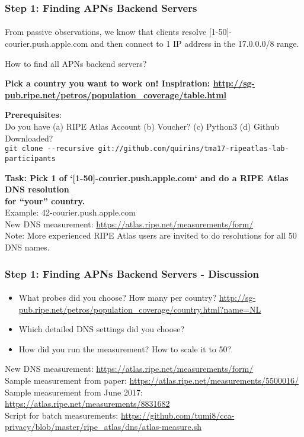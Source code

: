 \begin{frame}
\frametitle{Step 1: Finding APNs Backend Servers}
\framesubtitle{}

From passive observations, we know that clients resolve [1-50]-courier.push.apple.com and then connect to 1 IP address in the 17.0.0.0/8 range.

How to find all APNs backend servers?
\pause

\textbf{Pick a country you want to work on! Inspiration: \url{http://sg-pub.ripe.net/petros/population_coverage/table.html}}
\pause

\textbf{Prerequisites}: \\ 
Do you have (a) RIPE Atlas Account (b) Voucher? (c) Python3 (d) Github Downloaded? \\
\texttt{git clone -{}-recursive git://github.com/quirins/tma17-ripeatlas-lab-participants}

\pause

\textbf{Task: Pick 1 of `[1-50]-courier.push.apple.com` and do a RIPE Atlas DNS resolution \\ for ``your'' country.}\\
Example: 42-courier.push.apple.com \\
New DNS measurement: \url{https://atlas.ripe.net/measurements/form/} \\
Note: More experienced RIPE Atlas users are invited to do resolutions for all 50 DNS names.

\end{frame}
\clearpage
\begin{frame}
\frametitle{Step 1: Finding APNs Backend Servers - Discussion}
\framesubtitle{}
\begin{itemize}
	\item What probes did you choose? How many per country? \hyperlink{NL example}{\url{http://sg-pub.ripe.net/petros/population_coverage/country.html?name=NL}}
	\item Which detailed DNS settings did you choose?
	\item How did you run the measurement? How to scale it to 50?
\end{itemize}
New DNS measurement: \url{https://atlas.ripe.net/measurements/form/} \\
Sample measurement from paper: \url{https://atlas.ripe.net/measurements/5500016/} \\
Sample measurement from June 2017: \url{https://atlas.ripe.net/measurements/8831682} \\
Script for batch measurements: \url{https://github.com/tumi8/cca-privacy/blob/master/ripe\_atlas/dns/atlas-measure.sh} \\

\end{frame}
